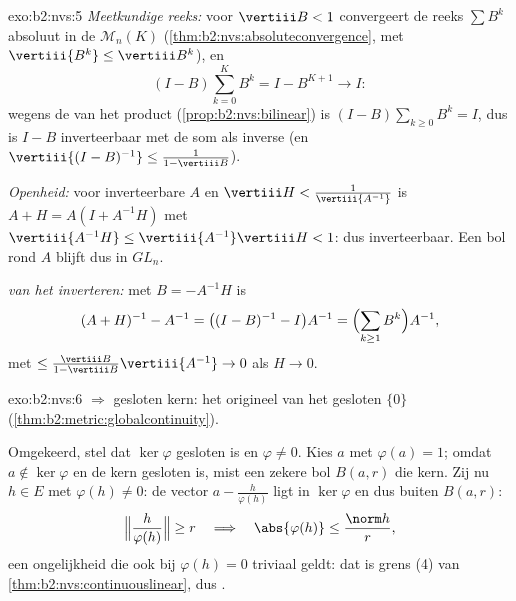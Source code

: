 \begin{solution}{exo:b2:nvs:5}
\emph{Meetkundige reeks:} voor $\vertiii B < 1$ convergeert de
reeks $\sum B^k$ absoluut in de  $\mathcal{M}_n(K)$
(\cref{thm:b2:nvs:absoluteconvergence}, met $\vertiii{B^k} \leq
\vertiii B^k$), en
\[
(I - B)\sum_{k=0}^{K} B^k = I - B^{K+1} \longrightarrow I :
\]
wegens de  van het product
(\cref{prop:b2:nvs:bilinear}) is $(I - B)\sum_{k\geq0} B^k = I$,
dus is $I - B$ inverteerbaar met de som als inverse (en
$\vertiii{(I-B)^{-1}} \leq \frac{1}{1 - \vertiii B}$).

\emph{Openheid:} voor inverteerbare $A$ en $\vertiii H <
\frac{1}{\vertiii{A^{-1}}}$ is $A + H = A(I + A^{-1}H)$ met
$\vertiii{A^{-1}H} \leq \vertiii{A^{-1}}\vertiii H < 1$: dus
inverteerbaar. Een bol rond $A$ blijft dus in $GL_n$.

\emph{ van het inverteren:} met $B = -A^{-1}H$ is
\[
(A + H)^{-1} - A^{-1} = \bigl((I - B)^{-1} - I\bigr)A^{-1}
= \Bigl(\sum_{k \geq 1} B^k\Bigr) A^{-1},
\]
met  $\leq \frac{\vertiii B}{1 - \vertiii
B}\vertiii{A^{-1}} \to 0$ als $H \to 0$.
\end{solution}

\begin{solution}{exo:b2:nvs:6}
 $\Rightarrow$ gesloten kern: het origineel van het gesloten
$\{0\}$ (\cref{thm:b2:metric:globalcontinuity}).

Omgekeerd, stel dat $\ker\varphi$ gesloten is en $\varphi \neq 0$.
Kies $a$ met $\varphi(a) = 1$; omdat $a \notin \ker\varphi$ en de
kern gesloten is, mist een zekere bol $B(a, r)$ die kern. Zij nu $h
\in E$ met $\varphi(h) \neq 0$: de vector $a -
\frac{h}{\varphi(h)}$ ligt in $\ker\varphi$ en dus buiten $B(a,
r)$:
\[
\Bigl\Vert \frac{h}{\varphi(h)} \Bigr\Vert \geq r
\quad\Longrightarrow\quad
\abs{\varphi(h)} \leq \frac{\norm h}{r},
\]
een ongelijkheid die ook bij $\varphi(h) = 0$ triviaal geldt: dat
is grens (4) van \cref{thm:b2:nvs:continuouslinear}, dus .
\end{solution}

